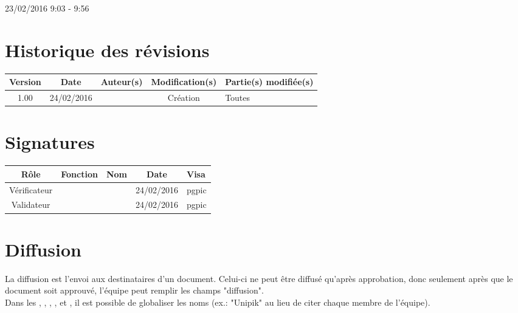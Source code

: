 \documentclass [a4paper] {article}
\begin{document}
\rhead{}

23/02/2016
\hfill   
\hfill 	9:03 - 9:56 				%



\section*{Historique des révisions}
\begin{center}
			\begin{tabular}{| c | c | c | c | p{4cm} |}
				\hline
				\rowcolor{Gray}
				Version & Date & Auteur(s) & Modification(s) & Partie(s) modifiée(s)		 \\
				\hline
				1.00 & 24/02/2016 & \Pierre & Création & Toutes \\
		\hline		
			\end{tabular}
		\end{center}

\section*{Signatures}

		\begin{center}
			\begin{tabular}{| c | c | c | c | p{4cm} |}
				\hline
				\rowcolor{Gray}
				Rôle & Fonction & Nom & Date & Visa		 \\
				\hline
				Vérificateur & \RQA & \Kafui & 24/02/2016 & pgpic \\[30pt]
				\hline
				Validateur & \CP & \Sergi & 24/02/2016 & pgpic \\[30pt]	
				\hline
			\end{tabular}
		\end{center}


\section{Diffusion}
La diffusion est l'envoi aux destinataires d'un document. Celui-ci ne peut être diffusé qu'après approbation, donc seulement après que le document soit approuvé, l'équipe peut remplir les champs "diffusion". \\
Dans les \DSE{}, \DSI{}, \PTV{}, \PQ{}, \PGC{} et \CDR{}, il est possible de globaliser les noms (ex.: "Unipik" au lieu de citer chaque membre de l'équipe).
\end{document}

